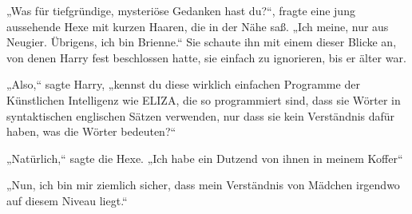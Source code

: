 „Was für tiefgründige, mysteriöse Gedanken hast du?“, fragte eine jung aussehende Hexe mit kurzen Haaren, die in der Nähe saß. „Ich meine, nur aus Neugier. Übrigens, ich bin Brienne.“
Sie schaute ihn mit einem dieser Blicke an, von denen Harry fest beschlossen hatte, sie einfach zu ignorieren, bis er älter war.

„Also,“ sagte Harry, „kennst du diese wirklich einfachen Programme der Künstlichen Intelligenz wie ELIZA, die so programmiert sind, dass sie Wörter in syntaktischen englischen Sätzen verwenden, nur dass sie kein Verständnis dafür haben, was die Wörter bedeuten?“

„Natürlich,“ sagte die Hexe. „Ich habe ein Dutzend von ihnen in meinem Koffer“

„Nun, ich bin mir ziemlich sicher, dass mein Verständnis von Mädchen irgendwo auf diesem Niveau liegt.“



